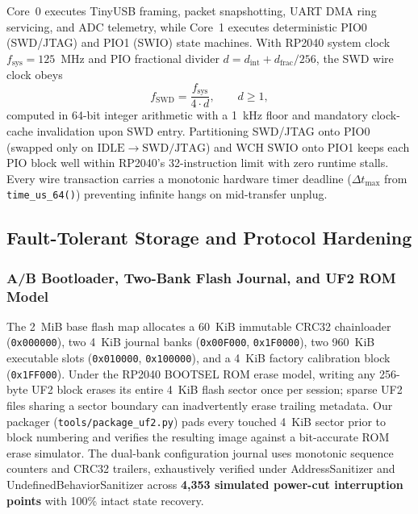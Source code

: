 \documentclass[journal]{IEEEtran}
\begin{document}
Core~0 executes TinyUSB framing, packet snapshotting, UART DMA ring servicing, and ADC telemetry, while Core~1 executes deterministic PIO0 (SWD/JTAG) and PIO1 (SWIO) state machines. With RP2040 system clock $f_{\text{sys}} = 125$~MHz and PIO fractional divider $d = d_{\text{int}} + d_{\text{frac}}/256$, the SWD wire clock obeys
\begin{equation}
f_{\text{SWD}} = \frac{f_{\text{sys}}}{4 \cdot d}, \qquad d \ge 1,
\end{equation}
computed in 64-bit integer arithmetic with a 1~kHz floor and mandatory clock-cache invalidation upon SWD entry. Partitioning SWD/JTAG onto PIO0 (swapped only on $\text{IDLE}\to\text{SWD}/\text{JTAG}$) and WCH SWIO onto PIO1 keeps each PIO block well within RP2040's 32-instruction limit with zero runtime stalls. Every wire transaction carries a monotonic hardware timer deadline ($\Delta t_{\max}$ from \texttt{time\_us\_64()}) preventing infinite hangs on mid-transfer unplug.

\subsection{Fault-Tolerant Storage and Protocol Hardening}
\subsubsection{A/B Bootloader, Two-Bank Flash Journal, and UF2 ROM Model}
The 2~MiB base flash map allocates a 60~KiB immutable CRC32 chainloader (\texttt{0x000000}), two 4~KiB journal banks (\texttt{0x00F000}, \texttt{0x1F0000}), two 960~KiB executable slots (\texttt{0x010000}, \texttt{0x100000}), and a 4~KiB factory calibration block (\texttt{0x1FF000}). Under the RP2040 BOOTSEL ROM erase model, writing any 256-byte UF2 block erases its entire 4~KiB flash sector once per session; sparse UF2 files sharing a sector boundary can inadvertently erase trailing metadata. Our packager (\texttt{tools/package\_uf2.py}) pads every touched 4~KiB sector prior to block numbering and verifies the resulting image against a bit-accurate ROM erase simulator. The dual-bank configuration journal uses monotonic sequence counters and CRC32 trailers, exhaustively verified under AddressSanitizer and UndefinedBehaviorSanitizer across \textbf{4,353 simulated power-cut interruption points} with 100\% intact state recovery.
\end{document}
